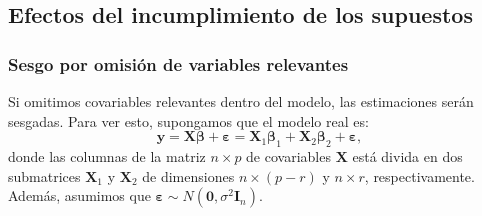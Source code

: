 \documentclass[
]{article}
\begin{document}
\subsection{Efectos del incumplimiento de los supuestos}\label{efectos-del-incumplimiento-de-los-supuestos}

\subsubsection{Sesgo por omisión de variables relevantes}\label{sesgo-por-omisiuxf3n-de-variables-relevantes}

Si omitimos covariables relevantes dentro del modelo, las estimaciones serán sesgadas. Para ver esto, supongamos que el modelo real es:
\[
\boldsymbol y= \boldsymbol X\boldsymbol \beta+ \boldsymbol \varepsilon=  \boldsymbol X_{1}\boldsymbol \beta_{1} + \boldsymbol X_{2}\boldsymbol \beta_{2} + \boldsymbol \varepsilon,
\]
donde las columnas de la matriz \(n\times p\) de covariables \(\boldsymbol X\) está divida en dos submatrices \(\boldsymbol X_{1}\) y \(\boldsymbol X_{2}\) de dimensiones \(n \times (p-r)\) y \(n\times r\), respectivamente. Además, asumimos que \(\boldsymbol \varepsilon\sim N(\boldsymbol 0, \sigma^{2}\boldsymbol I_{n})\).
\end{document}
